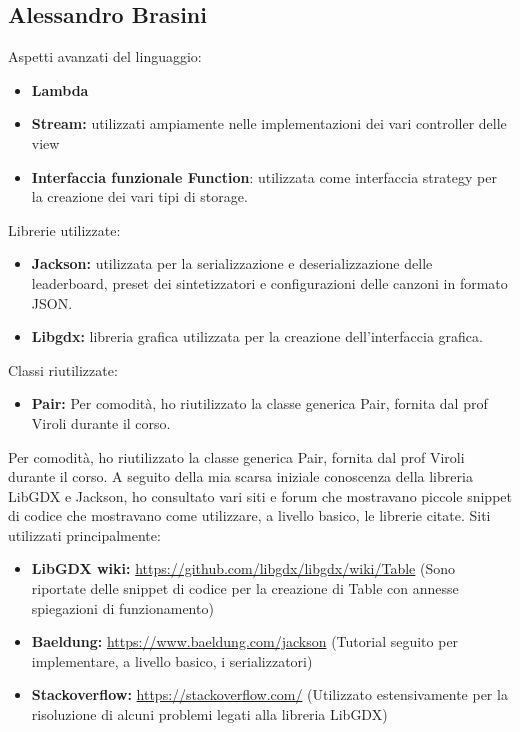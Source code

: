 \documentclass[a4paper,12pt]{report}
\begin{document}
\subsection{Alessandro Brasini}
Aspetti avanzati del linguaggio:
\begin{itemize}
	\item \textbf{Lambda}
	\item \textbf{Stream:} utilizzati ampiamente nelle implementazioni dei vari controller delle view
	\item \textbf{Interfaccia funzionale Function}: utilizzata come interfaccia strategy per la creazione dei vari tipi di storage.
\end{itemize}
Librerie utilizzate:
\begin{itemize}
	\item \textbf{Jackson:} utilizzata per la serializzazione e deserializzazione delle leaderboard, preset dei sintetizzatori e configurazioni delle canzoni
	in formato JSON.
	\item \textbf{Libgdx:} libreria grafica utilizzata per la creazione dell'interfaccia grafica.
\end{itemize}
 Classi riutilizzate:
 \begin{itemize}
 	\item \textbf{Pair:} Per comodità, ho riutilizzato la classe generica Pair, fornita dal prof Viroli durante il corso. 
 \end{itemize}
Per comodità, ho riutilizzato la classe generica Pair, fornita dal prof Viroli durante il corso. 
A seguito della mia scarsa iniziale conoscenza della libreria LibGDX e Jackson, ho consultato vari siti e forum che mostravano piccole snippet di codice 
che mostravano come utilizzare, a livello basico, le librerie citate. 
Siti utilizzati principalmente:
\begin{itemize}
	\item \textbf{LibGDX wiki:} \url{https://github.com/libgdx/libgdx/wiki/Table} (Sono riportate delle snippet di codice per la creazione di Table con annesse spiegazioni di funzionamento)
	\item \textbf{Baeldung:} \url{https://www.baeldung.com/jackson} (Tutorial seguito per implementare, a livello basico, i serializzatori) 
	\item \textbf{Stackoverflow:} \url{https://stackoverflow.com/} (Utilizzato estensivamente per la risoluzione di alcuni problemi legati alla libreria LibGDX)
\end{itemize}
\newpage
\end{document}
